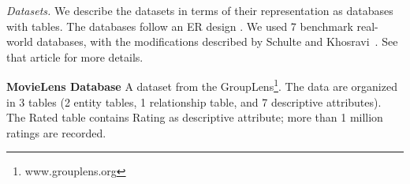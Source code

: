 \documentclass{vldb}
\begin{document}
\emph{Datasets.}
We describe the datasets in terms of their representation as databases with tables. The databases follow an ER design \cite{Ullman1982}. 
%
We used 7 benchmark real-world databases, with the modifications described by Schulte and Khosravi~\cite{Schulte2012}. See that article for more details.
%
%

\noindent\textbf{MovieLens Database } 
A dataset from the GroupLens\footnote{www.grouplens.org}. The data are organized in 3 tables (2 entity tables, 1 relationship table, and 7 descriptive attributes). The Rated table contains Rating as descriptive attribute; more than 1 million ratings are recorded.  

%

%
%
\end{document}

